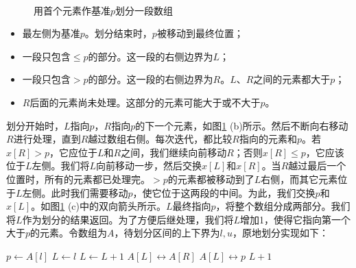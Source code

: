 \documentclass[b5paper]{ctexart}
\begin{document}
\begin{figure}[htbp]
{} \\
   \caption{用首个元素作基准$p$划分一段数组}
   \label{fig:partition-1-way}
\end{figure}

\begin{itemize}
\item 最左侧为基准$p$。划分结束时，$p$被移动到最终位置；
\item 一段只包含$\leq p$的部分。这一段的右侧边界为$L$；
\item 一段只包含$> p$的部分。这一段的右侧边界为$R$。$L$、$R$之间的元素都大于$p$；
\item $R$后面的元素尚未处理。这部分的元素可能大于或不大于$p$。
\end{itemize}

划分开始时，$L$指向$p$，$R$指向$p$的下一个元素，如图\cref{fig:partition-1-way} (b)所示。然后不断向右移动$R$进行处理，直到$R$越过数组右侧。每次迭代，都比较$R$指向的元素和$p$。若$x[R] > p$，它应位于$L$和$R$之间，我们继续向前移动$R$；否则$x[R] \leq p$，它应该位于$L$左侧。我们将$L$向前移动一步，然后交换$x[L]$和$x[R]$。当$R$越过最后一个位置时，所有的元素都已处理完。$> p$的元素都被移动到了$L$右侧，而其它元素位于$L$左侧。此时我们需要移动$p$，使它位于这两段的中间。为此，我们交换$p$和$x[L]$。如图\cref{fig:partition-1-way} (c)中的双向箭头所示。$L$最终指向$p$，将整个数组分成两部分。我们将$L$作为划分的结果返回。为了方便后继处理，我们将$L$增加1，使得它指向第一个大于$p$的元素。令数组为$A$，待划分区间的上下界为$l, u$，原地划分实现如下：

\begin{algorithmic}[1]
  \State $p \gets A[l]$  
  \State $L \gets l$ 
   
      \State $L \gets L + 1$
      \State {} $A[L] \leftrightarrow A[R]$
    \EndIf
  \EndFor
  \State {} $A[L] \leftrightarrow p$
  \State \Return $L + 1$ 
\EndFunction
\end{algorithmic}
\end{document}
